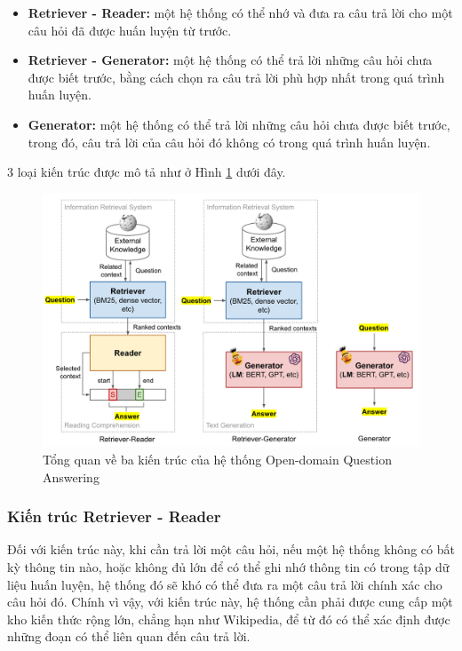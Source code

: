 \begin{itemize}
    \item \textbf{Retriever - Reader:} một hệ thống có thể nhớ và đưa ra câu trả lời cho một câu hỏi đã được huấn luyện từ trước.
    \item \textbf{Retriever - Generator:} một hệ thống có thể trả lời những câu hỏi chưa được biết trước, bằng cách chọn ra câu trả lời phù hợp nhất trong quá trình huấn luyện.
    \item \textbf{Generator:} một hệ thống có thể trả lời những câu hỏi chưa được biết trước, trong đó, câu trả lời của câu hỏi đó không có trong quá trình huấn luyện.
\end{itemize}

3 loại kiến trúc được mô tả như ở Hình \ref{fig:archs} dưới đây.
\begin{figure}[h!]
    \centering
    \includegraphics[width=\linewidth]{img/arch/archs.png}
    \caption{Tổng quan về ba kiến trúc của hệ thống Open-domain Question Answering}
    \label{fig:archs}
\end{figure}

\subsubsection{Kiến trúc Retriever - Reader}
Đối với kiến trúc này, khi cần trả lời một câu hỏi, nếu một hệ thống không có bất kỳ thông tin nào, hoặc không đủ lớn để có thể ghi nhớ thông tin có trong tập dữ liệu huấn luyện, hệ thống đó sẽ khó có thể đưa ra một câu trả lời chính xác cho câu hỏi đó. Chính vì vậy, với kiến trúc này, hệ thống cần phải được cung cấp một kho kiến thức rộng lớn, chẳng hạn như Wikipedia, để từ đó có thể xác định được những đoạn có thể liên quan đến câu trả lời.\\


